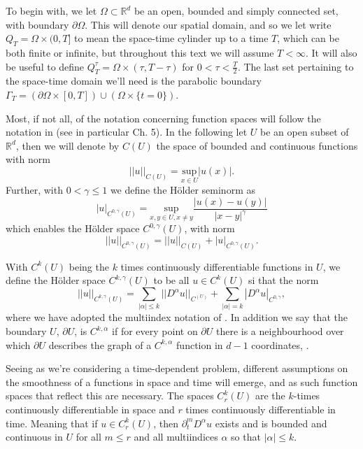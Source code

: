 \documentclass[11pt, a4paper]{article}
\begin{document}
To begin with, we let $\Omega \subset \mathbb{R}^d$ be an open, bounded and simply connected set, with boundary $\partial \Omega$. This will denote our spatial domain, and so we let write $Q_T = \Omega \times (0,T]$ to mean the space-time cylinder up to a time $T$, which can be both finite or infinite, but throughout this text we will assume $T < \infty$. It will also be useful to define $Q_T^\tau = \Omega \times (\tau, T-\tau)$ for $0<\tau < \frac{T}{2}$. The last set pertaining to the space-time domain we'll need is the parabolic boundary $\Gamma_T = (\partial \Omega \times [0,T]) \cup (\Omega\times \{t=0\})$.


Most, if not all, of the notation concerning function spaces will follow the notation in \citep{evans} (see in particular Ch. 5). In the following let $U$ be an open subset of $\mathbb{R}^d$, then we will denote by $C(U)$ the space of bounded and continuous functions with norm
\begin{equation*}
||u||_{C(U)} = \underset{x \in U}{\mathrm{sup}}|u(x)|.
\end{equation*}
Further, with $0< \gamma \leq 1$ we define the Hölder seminorm as
\begin{equation*}
|u|_{C^{0,\gamma}(U)} = \underset{x,y \in U, x\neq y}{\mathrm{sup}}\frac{|u(x)-u(y)|}{|x-y|^\gamma}
\end{equation*}
which enables the Hölder space $C^{0,\gamma}(U)$, with norm
\begin{equation*}
||u||_{C^{0,\gamma}(U)} = ||u||_{C(U)} + |u|_{C^{0,\gamma}(U)}.
\end{equation*}

With $C^k(U)$ being the $k$ times continuously differentiable functions in $U$, we define the Hölder space $C^{k,\gamma}(U)$ to be all $u \in C^{k}(U)$ si that the norm
\begin{equation*}
||u||_{C^{k,\gamma}(U)} = \sum_{|\alpha| \leq k} ||D^\alpha u||_{C^(U)} + \sum_{|\alpha| = k} |D^\alpha u |_{C^{0,\gamma}},
\end{equation*}
where we have adopted the multiindex notation of \citep{evans}. In addition we say that the boundary $U$, $\partial U$, is $C^{k, \alpha}$ if for every point on $\partial U$ there is a neighbourhood over which $\partial U$ describes the graph of a $C^{k,\alpha}$ function in $d-1$ coordinates, \citep{gilbarg2001elliptic}.

Seeing as we're considering a time-dependent problem, different assumptions on the smoothness of a functions in space and time will emerge, and as such function spaces that reflect this are necessary. The spaces $C^k_r(U)$ are the $k$-times continuously differentiable in space and $r$ times continuously differentiable in time. Meaning that if $u \in C^k_r(U)$, then $\partial_t^m D^\alpha u$ exists and is bounded and continuous in $U$ for all $m \leq r$ and all multiindices $\alpha$ so that $|\alpha| \leq k$.
\end{document}
